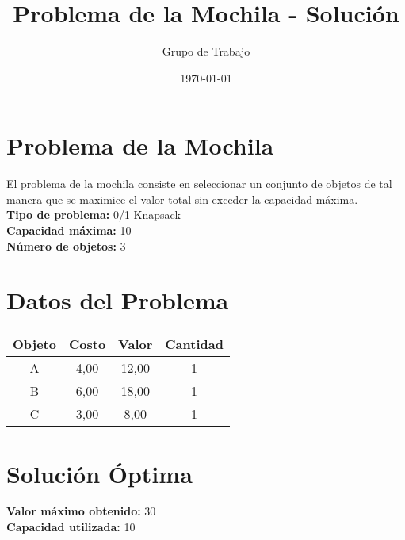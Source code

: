 \documentclass{article}
\title{Problema de la Mochila - Solución}
\author{Grupo de Trabajo}
\date{\today}
\begin{document}
\maketitle

\section*{Problema de la Mochila}
El problema de la mochila consiste en seleccionar un conjunto de objetos de tal manera que se maximice el valor total sin exceder la capacidad máxima.\\

\textbf{Tipo de problema:} 0/1 Knapsack\\
\textbf{Capacidad máxima:} 10\\
\textbf{Número de objetos:} 3\\

\section*{Datos del Problema}
\begin{tabular}{|c|c|c|c|}
\hline
Objeto & Costo & Valor & Cantidad \\
\hline
A & 4,00 & 12,00 & 1 \\
B & 6,00 & 18,00 & 1 \\
C & 3,00 & 8,00 & 1 \\
\hline
\end{tabular}

\section*{Solución Óptima}
\textbf{Valor máximo obtenido:} 30\\
\textbf{Capacidad utilizada:} 10\\
\end{document}
